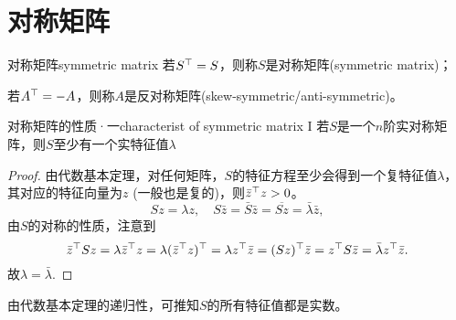 \section{对称矩阵}

\begin{definition}
	{对称矩阵}{symmetric matrix}
	若$S^\top=S$，则称$S$是对称矩阵(symmetric matrix)；
	
	若$A^\top=-A$，则称$A$是反对称矩阵(skew-symmetric/anti-symmetric)。
\end{definition}
\begin{theorem}{对称矩阵的性质·一}{characterist of symmetric matrix I}
	若$S$是一个$n$阶实对称矩阵，则$S$至少有一个实特征值$\lambda$
\end{theorem}
\begin{proof}
	由代数基本定理，对任何矩阵，$S$的特征方程至少会得到一个复特征值$\lambda$，其对应的特征向量为$z$ (一般也是复的)，则$\bar z^\top z>0$。
	\[
		Sz=\lambda z,\quad S\bar z=\bar S\bar z=\overline{Sz}=\bar\lambda\bar z,
	\]
	由$S$的对称的性质，注意到
	\[
		\bar z^\top Sz=\lambda\bar z^\top z=\lambda(\bar z^\top z)^\top=\lambda z^\top\bar z=(Sz)^\top\bar z=z^\top S\bar z=\bar\lambda z^\top\bar z.
	\]
	故$\lambda=\bar\lambda$.
\end{proof}

\begin{corollary}
	由代数基本定理的递归性，可推知$S$的所有特征值都是实数。
\end{corollary}

